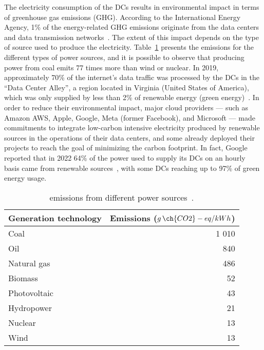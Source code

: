 The electricity consumption of the DCs results in environmental impact in terms of greenhouse gas emissions (GHG). According to the International Energy Agency, 1\% of the energy-related GHG emissions originate from the data centers and data transmission networks~\cite{IEA_2022}. The extent of this impact depends on the type of source used to produce the electricity. Table~\ref{tab:co2_power_sources} presents the emissions for the different types of power sources, and it is possible to observe that producing power from coal emits 77 times more  than wind or nuclear. In 2019, approximately 70\% of the internet's data traffic was processed by the DCs in the ``Data Center Alley'', a region located in Virginia (United States of America), which was only supplied by less than 2\% of renewable energy (green energy)~\cite{clicking_clean_virginia}. In order to reduce their environmental impact, major cloud providers --- such as Amazon AWS, Apple, Google, Meta (former Facebook), and Microsoft --- made commitments to integrate low-carbon intensive electricity produced by renewable sources in the operations of their data centers, and some already deployed their projects to reach the goal of minimizing the carbon footprint. In fact, Google reported that in 2022 64\% of the power used to supply its DCs on an hourly basis came from renewable sources~\cite{google_sustainability_report_2023}, with some DCs reaching up to 97\% of green energy usage.

\begin{table}[!ht]

\caption{  emissions from different power sources~\cite{nrel_lifecycle_2021}.}\label{tab:co2_power_sources} \centering

\begin{tabular}{|l|r|}
  \hline
  \textbf{Generation technology} & \textbf{Emissions ($g\,\ch{CO2}-eq/kWh$)}   \\
  \hline  
  Coal   & 1 010\\  
  \hline
  Oil   & 840\\
  \hline
  Natural gas   & 486\\
   \hline
  Biomass   & 52 \\
  \hline
  Photovoltaic   & 43 \\
  \hline
  Hydropower & 21 \\
  \hline
  Nuclear   & 13 \\
  \hline
  Wind   & 13 \\
  \hline
\end{tabular}
\end{table}


